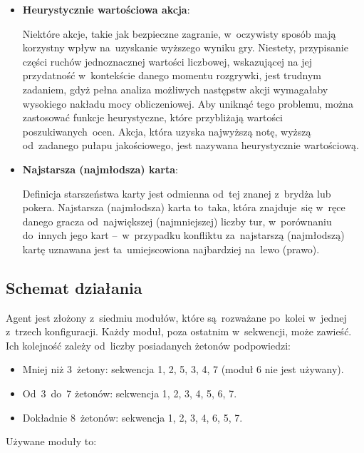 \documentclass[declaration,shortabstract,inz]{iithesis}
\begin{document}
\begin{itemize}
	\item \textbf{Heurystycznie wartościowa akcja}:
	
	Niektóre akcje, takie jak bezpieczne zagranie, w~oczywisty sposób mają korzystny wpływ na~uzyskanie wyższego wyniku gry. Niestety, przypisanie części ruchów jednoznacznej wartości liczbowej, wskazującej na jej przydatność w~kontekście danego momentu rozgrywki, jest trudnym zadaniem, gdyż pełna analiza możliwych następstw akcji wymagałaby wysokiego nakładu mocy obliczeniowej. Aby uniknąć tego problemu, można zastosować funkcje heurystyczne, które przybliżają wartości poszukiwanych~ocen. Akcja, która uzyska najwyższą notę, wyższą od~zadanego pułapu jakościowego, jest nazywana heurystycznie wartościową.
	
	\item \textbf{Najstarsza (najmłodsza) karta}:
	
	Definicja starszeństwa karty jest odmienna od~tej znanej z~brydża lub pokera. Najstarsza (najmłodsza) karta to~taka, która znajduje~się w~ręce danego gracza od~największej (najmniejszej) liczby tur, w~porównaniu do~innych jego kart --~w~przypadku konfliktu za~najstarszą (najmłodszą) kartę uznawana jest ta~umiejscowiona najbardziej na~lewo (prawo).

\end{itemize}

\subsection*{Schemat działania}

Agent jest złożony z~siedmiu modułów, które są~rozważane po~kolei w~jednej z~trzech konfiguracji. Każdy moduł, poza ostatnim w~sekwencji, może zawieść. Ich kolejność zależy od~liczby posiadanych żetonów podpowiedzi:

\begin{itemize}
	\item Mniej niż 3~żetony: sekwencja 1, 2, 5, 3, 4, 7 (moduł 6 nie jest używany).
	\item Od~3~do~7 żetonów: sekwencja 1, 2, 3, 4, 5, 6, 7.
	\item Dokładnie 8~żetonów: sekwencja 1, 2, 3, 4, 6, 5, 7.
\end{itemize}

\noindent Używane moduły to:
\end{document}
